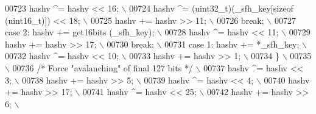\begin{DoxyCode}
{{{{{{{{00723 \textcolor{preprocessor}{            hashv ^= hashv << 16;                                                \(\backslash\)}
00724 \textcolor{preprocessor}{            hashv ^= (uint32\_t)(\_sfh\_key[sizeof (uint16\_t)]) << 18;              \(\backslash\)}
00725 \textcolor{preprocessor}{            hashv += hashv >> 11;                                                \(\backslash\)}
00726 \textcolor{preprocessor}{            break;                                                               \(\backslash\)}
00727 \textcolor{preprocessor}{    case 2: hashv += get16bits (\_sfh\_key);                                       \(\backslash\)}
00728 \textcolor{preprocessor}{            hashv ^= hashv << 11;                                                \(\backslash\)}
00729 \textcolor{preprocessor}{            hashv += hashv >> 17;                                                \(\backslash\)}
00730 \textcolor{preprocessor}{            break;                                                               \(\backslash\)}
00731 \textcolor{preprocessor}{    case 1: hashv += *\_sfh\_key;                                                  \(\backslash\)}
00732 \textcolor{preprocessor}{            hashv ^= hashv << 10;                                                \(\backslash\)}
00733 \textcolor{preprocessor}{            hashv += hashv >> 1;                                                 \(\backslash\)}
00734 \textcolor{preprocessor}{  \}                                                                              \(\backslash\)}
00735 \textcolor{preprocessor}{                                                                                 \(\backslash\)}
00736 \textcolor{preprocessor}{  }\textcolor{comment}{/* Force "avalanching" of final 127 bits */}\textcolor{preprocessor}{                                    \(\backslash\)}
00737 \textcolor{preprocessor}{  hashv ^= hashv << 3;                                                           \(\backslash\)}
00738 \textcolor{preprocessor}{  hashv += hashv >> 5;                                                           \(\backslash\)}
00739 \textcolor{preprocessor}{  hashv ^= hashv << 4;                                                           \(\backslash\)}
00740 \textcolor{preprocessor}{  hashv += hashv >> 17;                                                          \(\backslash\)}
00741 \textcolor{preprocessor}{  hashv ^= hashv << 25;                                                          \(\backslash\)}
00742 \textcolor{preprocessor}{  hashv += hashv >> 6;                                                           \(\backslash\)}
}}}}}}}}
\end{DoxyCode}
